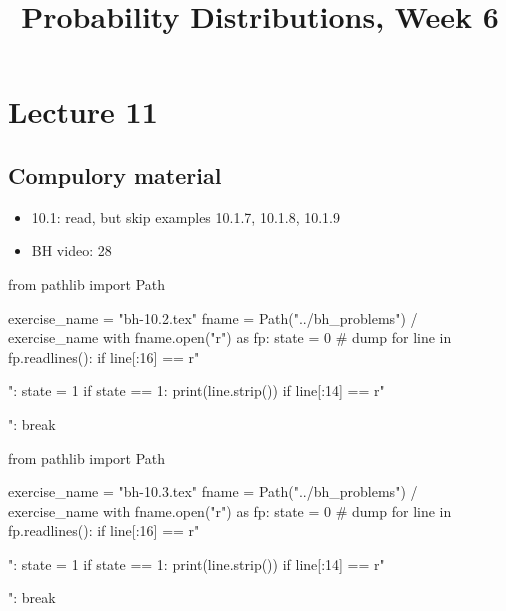 


\title{Probability Distributions, Week 6}


\maketitle
\toccontents


\section{Lecture 11}
\label{sec:lecture-1}

\subsection{Compulory material}
\label{sec:compulory-material}


\begin{itemize}
\item 10.1: read, but skip examples 10.1.7, 10.1.8, 10.1.9
\item BH video: 28
\end{itemize}

\begin{pycode}
from pathlib import Path

exercise_name = "bh-10.2.tex"
fname = Path("../bh_problems") / exercise_name
with fname.open("r") as fp:
    state = 0  # dump
    for line in fp.readlines():
        if line[:16] == r"\begin{exercise}":
            state = 1
        if state == 1:
            print(line.strip())
        if line[:14] == r"\end{exercise}":
            break
\end{pycode}

\begin{pycode}
from pathlib import Path

exercise_name = "bh-10.3.tex"
fname = Path("../bh_problems") / exercise_name
with fname.open("r") as fp:
    state = 0  # dump
    for line in fp.readlines():
        if line[:16] == r"\begin{exercise}":
            state = 1
        if state == 1:
            print(line.strip())
        if line[:14] == r"\end{exercise}":
            break
\end{pycode}



